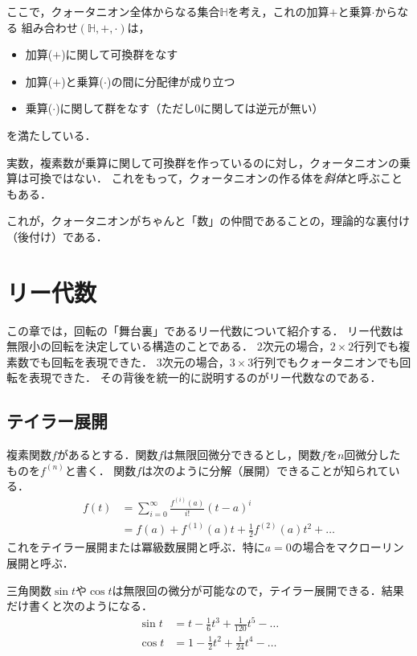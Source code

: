 \documentclass{jsbook}
\newcommand{\keyword}[1]{\emph{#1}}
\begin{document}
ここで，クォータニオン全体からなる集合$\mathbb{H}$を考え，これの加算$+$と乗算$\cdot$からなる
組み合わせ$(\mathbb{H},+,\cdot)$は，
\begin{itemize}
\item 加算($+$)に関して可換群をなす
\item 加算($+$)と乗算($\cdot$)の間に分配律が成り立つ
\item 乗算($\cdot$)に関して群をなす（ただし$0$に関しては逆元が無い）
\end{itemize}
を満たしている．

実数，複素数が乗算に関して可換群を作っているのに対し，クォータニオンの乗算は可換ではない．
これをもって，クォータニオンの作る体を\keyword{斜体}と呼ぶこともある．

これが，クォータニオンがちゃんと「数」の仲間であることの，理論的な裏付け（後付け）である．


\chapter{リー代数}

この章では，回転の「舞台裏」であるリー代数について紹介する．
リー代数は無限小の回転を決定している構造のことである．
2次元の場合，$2\times2$行列でも複素数でも回転を表現できた．
3次元の場合，$3\times3$行列でもクォータニオンでも回転を表現できた．
その背後を統一的に説明するのがリー代数なのである．

\section{テイラー展開}

複素関数$f$があるとする．関数$f$は無限回微分できるとし，関数$f$を$n$回微分したものを$f^{(n)}$と書く．
関数$f$は次のように分解（展開）できることが知られている．
\begin{align}
f(t)&=\sum_{i=0}^\infty\frac{f^{(i)}(a)}{i!}(t-a)^i\\
&=f(a)+f^{(1)}(a)t+\frac{1}{2}f^{(2)}(a)t^2+\dots
\end{align}
これをテイラー展開または冪級数展開と呼ぶ．特に$a=0$の場合をマクローリン展開と呼ぶ．

三角関数$\sin t$や$\cos t$は無限回の微分が可能なので，テイラー展開できる．結果だけ書くと次のようになる．
\begin{align}
\sin t&=t-\frac{1}{6}t^3+\frac{1}{120}t^5-\dots\\
\cos t&=1-\frac{1}{2}t^2+\frac{1}{24}t^4-\dots
\end{align}
\end{document}
